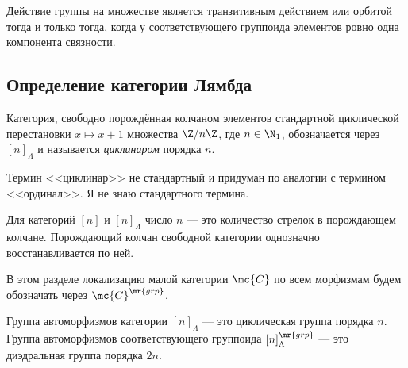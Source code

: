 \documentclass[
	extrafontsizes,
	11pt,
	hyphens,
]{memoir}
\begin{document}

\begin{example}%
Действие группы на множестве является {транзитивным действием} или {орбитой}
тогда и только тогда, когда у соответствующего группоида элементов ровно одна компонента связности.
\end{example}

\subsection{Определение категории Лямбда}

\begin{definition}%
[\scshape Циклинар]
Категория, свободно порождённая колчаном элементов стандартной циклической перестановки
\(x \mapsto x+1\) множества \(\Z/n\Z\),
где \(n \in \N_1\), обозначается через \([n]_\Lambda\) и называется
\emph{циклинаром}
порядка \(n\).
\end{definition}


\begin{remark}
Термин <<циклинар>> не стандартный и придуман по аналогии с термином <<ординал>>. Я не знаю стандартного термина.
\end{remark}

\begin{observation}
Для категорий \([n]\) и \([n]_\Lambda\) число \(n\) --- это количество стрелок в порождающем колчане.
Порождающий колчан свободной категории однозначно восстанавливается по ней.
\end{observation}

\begin{notation}
В этом разделе локализацию малой категории \(\mc{C}\) по всем морфизмам будем обозначать через
\(\mc{C}^\mr{grp}\).
\end{notation}

\begin{observation}
Группа автоморфизмов категории \([n]_\Lambda\) --- это циклическая группа порядка \(n\).
Группа автоморфизмов соответствующего группоида \([n]_\Lambda^\mr{grp}\) --- это диэдральная группа порядка \(2n\).
\end{observation}
\end{document}
